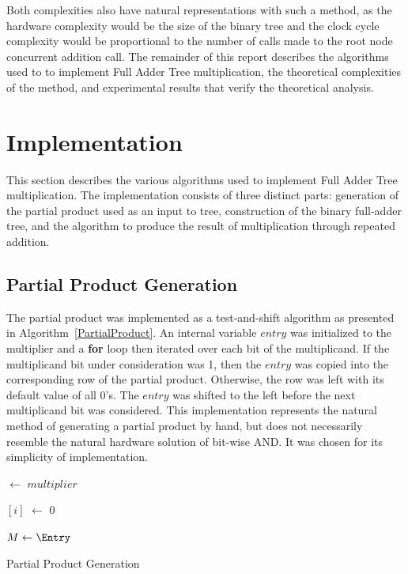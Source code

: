 \documentclass{article}
\begin{document}
Both complexities also have natural representations with such a method, as the hardware complexity would be the size of the binary tree and the clock cycle complexity would be proportional to the number of calls made to the root node concurrent addition call. The remainder of this report describes the algorithms used to to implement Full Adder Tree multiplication, the theoretical complexities of the method, and experimental results that verify the theoretical analysis.

\section{Implementation}
This section describes the various algorithms used to implement Full Adder Tree multiplication. The implementation consists of three distinct parts: generation of the partial product used as an input to tree, construction of the binary full-adder tree, and the algorithm to produce the result of multiplication through repeated addition.

\subsection{Partial Product Generation}
The partial product was implemented as a test-and-shift algorithm as presented in Algorithm~\ref{PartialProduct}. An internal variable $entry$ was initialized to the multiplier and a \textbf{for} loop then iterated over each bit of the multiplicand. If the multiplicand bit under consideration was 1, then the $entry$ was copied into the corresponding row of the partial product. Otherwise, the row was left with its default value of all 0's. The $entry$ was shifted to the left before the next multiplicand bit was considered. This implementation represents the natural method of generating a partial product by hand, but does not necessarily resemble the natural hardware solution of bit-wise AND. It was chosen for its simplicity of implementation.

\begin{algorithm}[h]
		
	
	\BlankLine
	\Entry $\leftarrow$ $multiplier$\;
	\BlankLine
	
	{
		\Entry$[i]$ $\leftarrow$ 0\;
	}
	\BlankLine
	
	{
		{
			$M \leftarrow \Entry$\;
		}
		\Shift{\Entry}\;
	}
	\caption{Partial Product Generation}
	\label{PartialProduct}
\end{algorithm}
\end{document}
